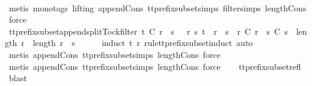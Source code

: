\ \ \isamarkupfalse%
\ {\isacharparenleft}metis\ {\isacharparenleft}mono{\isacharunderscore}tags{\isacharcomma}\ lifting{\isacharparenright}\ append{\isacharunderscore}Cons\ tt{\isacharunderscore}prefix{\isacharunderscore}subset{\isachardot}simps{\isacharparenleft}{}{\isacharparenright}\ filter{\isachardot}simps{\isacharparenleft}{}{\isacharparenright}\ length{\isacharunderscore}Cons{\isacharcomma}\ force{\isacharplus}{\isacharparenright}\isanewline
\ \ \isamarkupfalse%
%
\endisatagproof
{\isafoldproof}%
%
\isadelimproof
\isanewline
%
\endisadelimproof
\isanewline
{}\isamarkupfalse%
\ tt{\isacharunderscore}prefix{\isacharunderscore}subset{\isacharunderscore}append{\isacharunderscore}split{\isacharunderscore}Tock{\isacharunderscore}filter{\isacharcolon}\ {\isachardoublequoteopen}t\ {\isasymlesssim}\isactrlsub C\ r\ {\isacharat}\ s\ {\isasymLongrightarrow}\ {\isasymexists}\ r{\isacharprime}\ s{\isacharprime}{\isachardot}\ t\ {\isacharequal}\ r{\isacharprime}\ {\isacharat}\ s{\isacharprime}\ {\isasymand}\ r{\isacharprime}\ {\isasymlesssim}\isactrlsub C\ r\ {\isasymand}\ s{\isacharprime}\ {\isasymlesssim}\isactrlsub C\ s\ {\isasymand}\ {\isacharparenleft}length\ r{\isacharprime}\ {\isacharequal}\ length\ r\ {\isasymor}\ s{\isacharprime}\ {\isacharequal}\ {\isacharbrackleft}{\isacharbrackright}{\isacharparenright}{\isachardoublequoteclose}\isanewline
%
\isadelimproof
\ \ %
\endisadelimproof
%
\isatagproof
{}\isamarkupfalse%
\ {\isacharparenleft}induct\ t\ {\isachardoublequoteopen}r{\isachardoublequoteclose}\ rule{\isacharcolon}tt{\isacharunderscore}prefix{\isacharunderscore}subset{\isachardot}induct{\isacharcomma}\ auto{\isacharparenright}\isanewline
\ \ \isamarkupfalse%
\ {\isacharparenleft}metis\ append{\isacharunderscore}Cons\ tt{\isacharunderscore}prefix{\isacharunderscore}subset{\isachardot}simps{\isacharparenleft}{}{\isacharparenright}\ length{\isacharunderscore}Cons{\isacharcomma}\ force{\isacharparenright}\isanewline
\ \ \isamarkupfalse%
\ {\isacharparenleft}metis\ append{\isacharunderscore}Cons\ tt{\isacharunderscore}prefix{\isacharunderscore}subset{\isachardot}simps{\isacharparenleft}{}{\isacharparenright}\ length{\isacharunderscore}Cons{\isacharcomma}\ force{\isacharparenright}\isanewline
\ \ \isamarkupfalse%
\ tt{\isacharunderscore}prefix{\isacharunderscore}subset{\isacharunderscore}refl\ \isamarkupfalse%
\ blast%
\endisatagproof
{\isafoldproof}%
%
\isadelimproof
\isanewline
